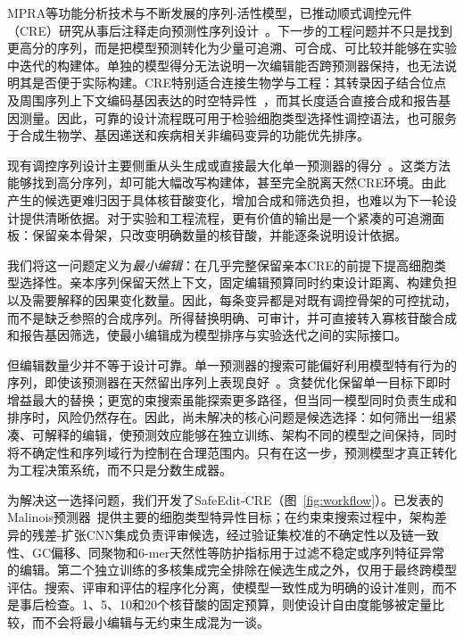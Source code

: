MPRA等功能分析技术与不断发展的序列-活性模型，已推动顺式调控元件（CRE）研究从事后注释走向预测性序列设计~\citep{Melnikov2012,Arnold2013,Tewhey2016,Inoue2017,Gordon2020,Kircher2019,Avsec2021,Taskiran2024,Gosai2024}。下一步的工程问题并不只是找到更高分的序列，而是把模型预测转化为少量可追溯、可合成、可比较并能够在实验中迭代的构建体。单独的模型得分无法说明一次编辑能否跨预测器保持，也无法说明其是否便于实际构建。CRE特别适合连接生物学与工程：其转录因子结合位点及周围序列上下文编码基因表达的时空特异性~\citep{Wasserman2004,ENCODE2012,Thurman2012,Roadmap2015,Sahu2022}，而其长度适合直接合成和报告基因测量。因此，可靠的设计流程既可用于检验细胞类型选择性调控语法，也可服务于合成生物学、基因递送和疾病相关非编码变异的功能优先排序。

现有调控序列设计主要侧重从头生成或直接最大化单一预测器的得分~\citep{Vaishnav2022,Almeida2024,Gosai2024}。这类方法能够找到高分序列，却可能大幅改写构建体，甚至完全脱离天然CRE环境。由此产生的候选更难归因于具体核苷酸变化，增加合成和筛选负担，也难以为下一轮设计提供清晰依据。对于实验和工程流程，更有价值的输出是一个紧凑的可追溯面板：保留亲本骨架，只改变明确数量的核苷酸，并能逐条说明设计依据。

我们将这一问题定义为\emph{最小编辑}：在几乎完整保留亲本CRE的前提下提高细胞类型选择性。亲本序列保留天然上下文，固定编辑预算同时约束设计距离、构建负担以及需要解释的因果变化数量。因此，每条变异都是对既有调控骨架的可控扰动，而不是缺乏参照的合成序列。所得替换明确、可审计，并可直接转入寡核苷酸合成和报告基因筛选，使最小编辑成为模型排序与实验迭代之间的实际接口。

但编辑数量少并不等于设计可靠。单一预测器的搜索可能偏好利用模型特有行为的序列，即使该预测器在天然留出序列上表现良好~\citep{Whalen2022,deBoer2024,Ovadia2019,Rafi2025}。贪婪优化保留单一目标下即时增益最大的替换；更宽的束搜索虽能探索更多路径，但当同一模型同时负责生成和排序时，风险仍然存在。因此，尚未解决的核心问题是候选选择：如何筛出一组紧凑、可解释的编辑，使预测效应能够在独立训练、架构不同的模型之间保持，同时将不确定性和序列域行为控制在合理范围内。只有在这一步，预测模型才真正转化为工程决策系统，而不只是分数生成器。

为解决这一选择问题，我们开发了SafeEdit-CRE（图~\ref{fig:workflow}）。已发表的Malinois预测器~\citep{Gosai2024}提供主要的细胞类型特异性目标；在约束束搜索过程中，架构差异的残差-扩张CNN集成负责评审候选，经过验证集校准的不确定性以及链一致性、GC偏移、同聚物和6-mer天然性等防护指标用于过滤不稳定或序列特征异常的编辑。第二个独立训练的多核集成完全排除在候选生成之外，仅用于最终跨模型评估。搜索、评审和评估的程序化分离，使模型一致性成为明确的设计准则，而不是事后检查。1、5、10和20个核苷酸的固定预算，则使设计自由度能够被定量比较，而不会将最小编辑与无约束生成混为一谈。

